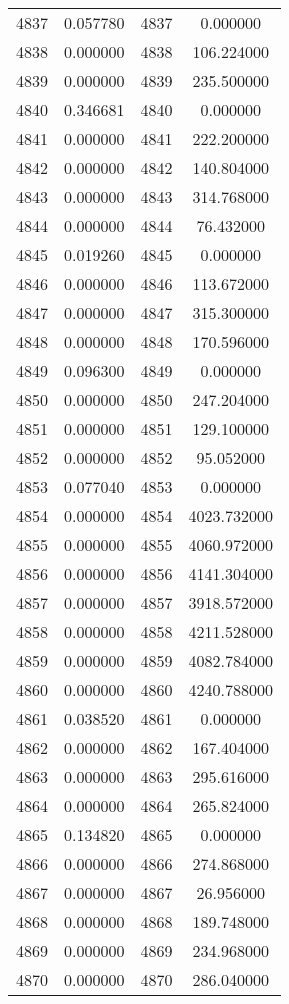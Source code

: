 \documentclass[12pt]{article}
\begin{document}
\begin{longtable}{@{}cccc@{}}
4837 & 0.057780 & 4837 & 0.000000 \\
4838 & 0.000000 & 4838 & 106.224000 \\
4839 & 0.000000 & 4839 & 235.500000 \\
4840 & 0.346681 & 4840 & 0.000000 \\
4841 & 0.000000 & 4841 & 222.200000 \\
4842 & 0.000000 & 4842 & 140.804000 \\
4843 & 0.000000 & 4843 & 314.768000 \\
4844 & 0.000000 & 4844 & 76.432000 \\
4845 & 0.019260 & 4845 & 0.000000 \\
4846 & 0.000000 & 4846 & 113.672000 \\
4847 & 0.000000 & 4847 & 315.300000 \\
4848 & 0.000000 & 4848 & 170.596000 \\
4849 & 0.096300 & 4849 & 0.000000 \\
4850 & 0.000000 & 4850 & 247.204000 \\
4851 & 0.000000 & 4851 & 129.100000 \\
4852 & 0.000000 & 4852 & 95.052000 \\
4853 & 0.077040 & 4853 & 0.000000 \\
4854 & 0.000000 & 4854 & 4023.732000 \\
4855 & 0.000000 & 4855 & 4060.972000 \\
4856 & 0.000000 & 4856 & 4141.304000 \\
4857 & 0.000000 & 4857 & 3918.572000 \\
4858 & 0.000000 & 4858 & 4211.528000 \\
4859 & 0.000000 & 4859 & 4082.784000 \\
4860 & 0.000000 & 4860 & 4240.788000 \\
4861 & 0.038520 & 4861 & 0.000000 \\
4862 & 0.000000 & 4862 & 167.404000 \\
4863 & 0.000000 & 4863 & 295.616000 \\
4864 & 0.000000 & 4864 & 265.824000 \\
4865 & 0.134820 & 4865 & 0.000000 \\
4866 & 0.000000 & 4866 & 274.868000 \\
4867 & 0.000000 & 4867 & 26.956000 \\
4868 & 0.000000 & 4868 & 189.748000 \\
4869 & 0.000000 & 4869 & 234.968000 \\
4870 & 0.000000 & 4870 & 286.040000 \\

\end{longtable}
\end{document}
